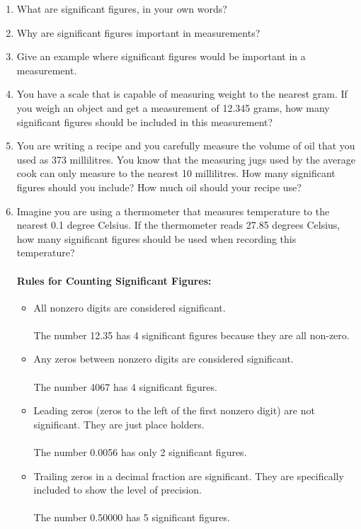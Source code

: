 \documentclass{article}
\begin{document}
\begin{enumerate}
\item What are significant figures, in your own words?
\item Why are significant figures important in measurements?
\item Give an example where significant figures would be important in a measurement.
\item You have a scale that is capable of measuring weight to the nearest gram. If you weigh an object and get a measurement of 12.345 grams, how many significant figures should be included in this measurement?
\item You are writing a recipe and you carefully measure the volume of oil that you used as 373 millilitres. You know that the measuring jugs used by the average cook can only measure to the nearest 10 millilitres. How many significant figures should you include? How much oil should your recipe use?
\item Imagine you are using a thermometer that measures temperature to the nearest 0.1 degree Celsius. If the thermometer reads 27.85 degrees Celsius, how many significant figures should be used when recording this temperature?

\paragraph{Rules for Counting Significant Figures:}
\begin{itemize}

\item All nonzero digits are considered significant.\\\\The number 12.35 has 4 significant figures because they are all non-zero.

\item Any zeros between nonzero digits are considered significant.\\\\The number 4067 has 4 significant figures.

\item Leading zeros (zeros to the left of the first nonzero digit) are not significant. They are just place holders.\\\\The number 0.0056 has only 2 significant figures.

\item Trailing zeros in a decimal fraction are significant. They are specifically included to show the level of precision.\\\\The number 0.50000 has 5 significant figures.


\end{itemize}
\end{enumerate}
\end{document}
